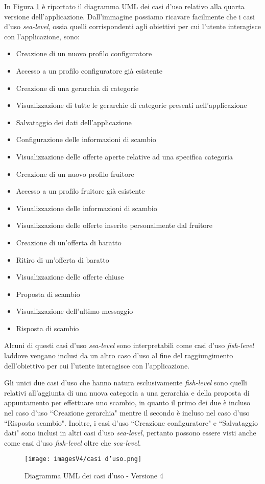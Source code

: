 In Figura \ref{fig:Use Case 4} è riportato il diagramma UML dei casi d'uso relativo alla quarta versione dell'applicazione. Dall'immagine possiamo ricavare facilmente che i casi d'uso \textit{sea-level}, ossia quelli corrispondenti agli obiettivi per cui l'utente interagisce con l'applicazione, sono:
\begin{itemize}
    \item Creazione di un nuovo profilo configuratore 
    \item Accesso a un profilo configuratore già esistente
    \item Creazione di una gerarchia di categorie
    \item Visualizzazione di tutte le gerarchie di categorie presenti nell'applicazione
    \item Salvataggio dei dati dell'applicazione
    \item Configurazione delle informazioni di scambio
    \item Visualizzazione delle offerte aperte relative ad una specifica categoria
    \item Creazione di un nuovo profilo fruitore
    \item Accesso a un profilo fruitore già esistente
    \item Visualizzazione delle informazioni di scambio
    \item Visualizzazione delle offerte inserite personalmente dal fruitore
    \item Creazione di un'offerta di baratto
    \item Ritiro di un'offerta di baratto  
    \item Visualizzazione delle offerte chiuse
    \item Proposta di scambio
    \item Visualizzazione dell'ultimo messaggio
    \item Risposta di scambio
\end{itemize}
Alcuni di questi casi d'uso \textit{sea-level} sono interpretabili come casi d'uso \textit{fish-level} laddove vengano inclusi da un altro caso d'uso al fine del raggiungimento dell'obiettivo per cui l'utente interagisce con l'applicazione.

Gli unici due casi d'uso che hanno natura esclusivamente \textit{fish-level} sono quelli relativi all'aggiunta di una nuova categoria a una gerarchia e della proposta di appuntamento per effettuare uno scambio, in quanto il primo dei due è incluso nel caso d'uso ``Creazione gerarchia" mentre il secondo è incluso nel caso d'uso ``Risposta scambio". Inoltre, i casi d'uso ``Creazione configuratore" e ``Salvataggio dati" sono inclusi in altri casi d'uso \textit{sea-level}, pertanto possono essere visti anche come casi d'uso \textit{fish-level} oltre che \textit{sea-level}.

\begin{figure}[ht]
\centering
\texttt{[image: imagesV4/casi d'uso.png]}
\caption{\label{fig:Use Case 4}Diagramma UML dei casi d'uso - Versione 4}
\end{figure}\bigskip

